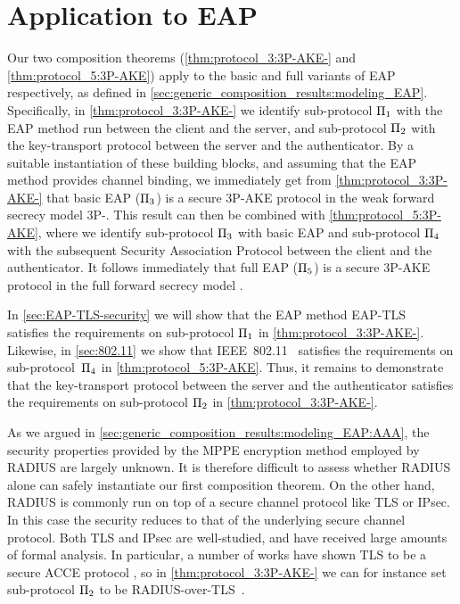 \section{Application to EAP}\label{sec:EAP}

Our two composition theorems (\cref{thm:protocol_3:3P-AKE-} and \cref{thm:protocol_5:3P-AKE})
apply to the basic and full variants of EAP respectively,
as defined in \cref{sec:generic_composition_results:modeling_EAP}.
Specifically,
in \cref{thm:protocol_3:3P-AKE-} we identify sub-protocol $\mathrm{\Pi}_1$ with the EAP method run between the client and the server,
and sub-protocol $\mathrm{\Pi}_2$ with the key-transport protocol between the server and the authenticator. 
By a suitable instantiation of these building blocks,
and assuming that the EAP method provides channel binding,
we immediately get from \cref{thm:protocol_3:3P-AKE-} that basic EAP ($\mathrm{\Pi}_3$) is a secure 3P-AKE protocol in the weak forward secrecy model 3P-\akewfstext.
This result can then be combined with \cref{thm:protocol_5:3P-AKE},
where we identify sub-protocol $\mathrm{\Pi}_3$ with basic EAP and sub-protocol $\mathrm{\Pi}_4$ with the subsequent Security Association Protocol between the client and the authenticator.
It follows immediately that full EAP ($\mathrm{\Pi}_5$) is a secure 3P-AKE protocol in the full forward secrecy model \akefstext.

In \cref{sec:EAP-TLS-security} we will show that the EAP method EAP-TLS~\cite{IETF:RFC5216:EAP-TLS} satisfies the requirements on sub-protocol $\mathrm{\Pi}_1$ in \cref{thm:protocol_3:3P-AKE-}.
Likewise,
in \cref{sec:802.11} we show that IEEE~802.11~\cite{IEEE:2012:802.11} satisfies the requirements on sub-protocol~$\mathrm{\Pi}_4$ in \cref{thm:protocol_5:3P-AKE}.
Thus,
it remains to demonstrate that the key-transport protocol between the server and the authenticator satisfies the requirements on sub-protocol $\mathrm{\Pi}_2$ in \cref{thm:protocol_3:3P-AKE-}.

As we argued in \cref{sec:generic_composition_results:modeling_EAP:AAA},
the security properties provided by the MPPE encryption method employed by RADIUS are largely unknown.
It is therefore difficult to assess whether RADIUS alone can safely instantiate our first composition theorem.
On the other hand,
RADIUS is commonly run on top of a secure channel protocol like TLS or IPsec.
In this case the security reduces to that of the underlying secure channel protocol.
Both TLS and IPsec are well-studied,
and have received large amounts of formal analysis.
In particular,
a number of works have shown TLS to be a secure ACCE protocol
\cite{C:JKSS12,C:KraPatWee13,EPRINT:KohSchSch13,BrzuskaFSWW:2012:less_is_more,PKC:LSYKS14},
so in \cref{thm:protocol_3:3P-AKE-} we can for instance set sub-protocol $\mathrm{\Pi}_2$ to be RADIUS-over-TLS~\cite{IETF:RFC6614:RADIUS_over_TLS}.


